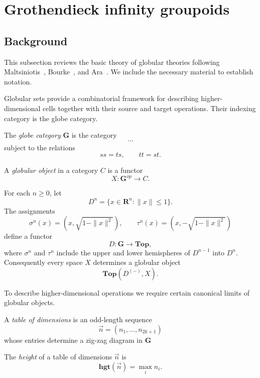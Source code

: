 \documentclass{tac}
\begin{document}
\section{Grothendieck infinity groupoids}
\subsection*{Background}

This subsection reviews the basic theory of globular theories following
Maltsiniotis~\cite{Malt}, Bourke~\cite{Bo2}, and Ara~\cite{Dim1}. We include the necessary material to establish notation.

Globular sets provide a combinatorial framework for describing higher-dimensional cells together with their source and target operations. Their indexing category is the globe category.

\begin{notation}
The \emph{globe category} $\mathbf{G}$ is the category
\[
\cdots
\]
subject to the relations
\[
ss=ts,\qquad tt=st.
\]
\end{notation}

\begin{definition}
A \emph{globular object} in a category $C$ is a functor
\[
X:\mathbf{G}^{op}\longrightarrow C.
\]
\end{definition}

\begin{example}\label{example_important}
For each $n\ge0$, let
\[
D^n=\{x\in\mathbf R^n:\|x\|\le1\}.
\]
The assignments
\[
\sigma^n(x)=\left(x,\sqrt{1-\|x\|^2}\right),
\qquad
\tau^n(x)=\left(x,-\sqrt{1-\|x\|^2}\right)
\]
define a functor
\[
D:\mathbf G\to\mathbf{Top},
\]
where $\sigma^n$ and $\tau^n$ include the upper and lower hemispheres of
$D^{n-1}$ into $D^n$. Consequently every space $X$ determines a globular object
\[
\mathbf{Top}(D^{(-)},X).
\]
\end{example}

To describe higher-dimensional operations we require certain canonical limits of globular objects.

\begin{definition}
A \emph{table of dimensions} is an odd-length sequence
\[
\vec n=(n_1,\ldots,n_{2k+1})
\]
whose entries determine a zig-zag diagram in $\mathbf G$
\end{definition}

\begin{definition}
The \emph{height} of a table of dimensions $\vec n$ is
\[
\mathbf{hgt}(\vec n)=\max_i n_i.
\]
\end{definition}
\end{document}
